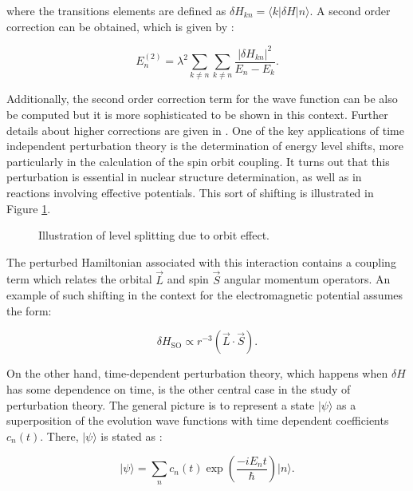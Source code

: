 \documentclass[openany]{book}
\begin{document}
where the transitions elements are defined as $\delta H_{kn} = \langle k |  \delta H | n \rangle $. A second order correction can be obtained, which is given by \cite{dick_2016}: 

\begin{equation} \label{eq:perturbationTheory_timeIndependent_E2}
	E^{(2)}_n = \lambda^2 \sum_{k \neq n} \sum_{k \neq n} {\frac{ {\left | \delta H_{kn} \right|}^2 }{E_n - E_k}}.
\end{equation}

Additionally, the second order correction term for the wave function can be also be computed but it is more sophisticated to be shown in this context. Further details about higher corrections are given in \cite{dick_2016}. One of the key applications of time independent perturbation theory is the determination of energy level shifts, more particularly in the calculation of the spin orbit coupling. It turns out that this perturbation is essential in nuclear structure determination, as well as in reactions involving effective potentials. This sort of shifting is illustrated in Figure \ref{fig:spinOrbitSplitting}.

\begin{figure}[H]
	
	\caption[Spin orbit splitting representation]{Illustration of level splitting due to orbit effect.}
	\label{fig:spinOrbitSplitting}
\end{figure}

The perturbed Hamiltonian associated with this interaction contains a coupling term which relates the orbital  $\vec L$ and spin $\vec S$ angular momentum operators. An example of such shifting in the context for the electromagnetic potential assumes the form:

\begin{equation} \label{eq:perturbationTheory_spinOrbit}
	\delta H_{\mathrm{SO}} \propto r^{-3} (\vec L \cdot \vec S).
\end{equation}

On the other hand, time-dependent perturbation theory, which happens when $\delta H$ has some dependence on time, is the other central case in the study of perturbation theory. The general picture is to represent a state $|\psi \rangle$ as a superposition of the evolution wave functions with time dependent coefficients $c_n(t)$. There, $|\psi \rangle$ is stated as \cite{basdevant_rich_spiro_2004}:

\begin{equation}\label{eq:perturbationTheory_timeDeependent_superposition}
	|\psi \rangle = \sum_{n} {c_n(t) \exp {\left(\frac{-iE_nt}{\hbar}\right)} |n \rangle}.
\end{equation}
\end{document}
